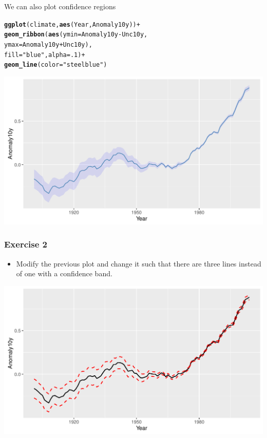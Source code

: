 \documentclass{beamer}\usepackage[]{graphicx}\usepackage[]{color}
\makeatletter
\newcommand{\hlnum}[1]{\textcolor[rgb]{0.686,0.059,0.569}{#1}}%
\newcommand{\hlstr}[1]{\textcolor[rgb]{0.192,0.494,0.8}{#1}}%
\newcommand{\hlopt}[1]{\textcolor[rgb]{0,0,0}{#1}}%
\newcommand{\hlstd}[1]{\textcolor[rgb]{0.345,0.345,0.345}{#1}}%
\newcommand{\hlkwc}[1]{\textcolor[rgb]{0.333,0.667,0.333}{#1}}%
\newcommand{\hlkwd}[1]{\textcolor[rgb]{0.737,0.353,0.396}{\textbf{#1}}}%
\newenvironment{kframe}{%
 \def\at@end@of@kframe{}%
 \ifinner\ifhmode%
  \def\at@end@of@kframe{\end{minipage}}%
  \begin{minipage}{\columnwidth}%
 \fi\fi%
 \def\FrameCommand##1{\hskip\@totalleftmargin \hskip-\fboxsep
 \colorbox{shadecolor}{##1}\hskip-\fboxsep
     \hskip-\linewidth \hskip-\@totalleftmargin \hskip\columnwidth}%
 \MakeFramed {\advance\hsize-\width
   \@totalleftmargin\z@ \linewidth\hsize
   \@setminipage}}%
 {\par\unskip\endMakeFramed%
 \at@end@of@kframe}
\newenvironment{knitrout}{}{} %
\makeatother
\begin{document}
\begin{frame}[fragile]
We can also plot confidence regions
\begin{knitrout}\footnotesize
{}\color{fgcolor}\begin{kframe}
\begin{alltt}
\hlkwd{ggplot}\hlstd{(climate,} \hlkwd{aes}\hlstd{(Year, Anomaly10y))} \hlopt{+}
    \hlkwd{geom_ribbon}\hlstd{(}\hlkwd{aes}\hlstd{(}\hlkwc{ymin} \hlstd{= Anomaly10y} \hlopt{-} \hlstd{Unc10y,}
        \hlkwc{ymax} \hlstd{= Anomaly10y} \hlopt{+} \hlstd{Unc10y),}
        \hlkwc{fill} \hlstd{=} \hlstr{"blue"}\hlstd{,} \hlkwc{alpha} \hlstd{=} \hlnum{.1}\hlstd{)} \hlopt{+}
    \hlkwd{geom_line}\hlstd{(}\hlkwc{color} \hlstd{=} \hlstr{"steelblue"}\hlstd{)}
\end{alltt}
\end{kframe}

{\centering \includegraphics[width=.75\linewidth]{figure/lineb-1} 

}



\end{knitrout}
\end{frame}


\begin{frame}[fragile]
\frametitle{Exercise 2}
\begin{itemize}
\item Modify the previous plot and change it such that there are three lines instead of one with a confidence band.
\end{itemize}
\begin{knitrout}\footnotesize
{}\color{fgcolor}

{\centering \includegraphics[width=.75\linewidth]{figure/ex2-1} 

}



\end{knitrout}
\end{frame}
\end{document}
